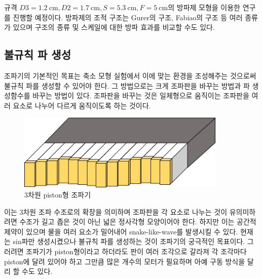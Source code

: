 규격 $D3=1.2\mathrm{~cm}, D2=1.7\mathrm{~cm}, S=5.3\mathrm{~cm}, F=5\mathrm{~cm}$의 방파제 모형을 이용한 연구를 진행할 예정이다. 방파제의 조적 구조는 Gurer의 구조, Fabiao의 구조 등 여러 종류가 있으며 구조의 종류 및 스케일에 대한 방파 효과를 비교할 수도 있다\cite{article}.

\subsection{불규칙 파 생성}
조파기의 기본적인 목표는 축소 모형 실험에서 이에 맞는 환경을 조성해주는 것으로써 불규칙 파를 생성할 수 있어야 한다. 그 방법으로는 크게 조파판을 바꾸는 방법과 파 생성함수를 바꾸는 방법이 있다. 조파판을 바꾸는 것은 일체형으로 움직이는 조파판을 여러 요소로 나누어 다르게 움직이도록 하는 것이다.

\begin{figure}[htbp]
    \centering
    \includegraphics[width=10cm]{images/Wave_Maker(Snake).jpg}
    \caption{3차원 piston형 조파기}
    \label{Snake Wave Maker}
\end{figure}

이는 3차원 조파 수조로의 확장을 의미하며 조파판을 각 요소로 나누는 것이 유의미하려면 수조가 길고 좁은 것이 아닌 넓은 정사각형 모양이어야 한다. 하지만 이는 공간적 제약이 있으며 물을 여러 요소가 밀어내어 snake-like-wave를 발생시킬 수 있다. 현재는 sin파만 생성시켰으나 불규칙 파를 생성하는 것이 조파기의 궁극적인 목표이다. 그러려면 조파기가 piston형이라고 하더라도 판이 여러 조각으로 갈라져 각 조각마다 piston에 달려 있어야 하고 그만큼 많은 개수의 모터가 필요하며 아예 구동 방식을 달리 할 수도 있다.